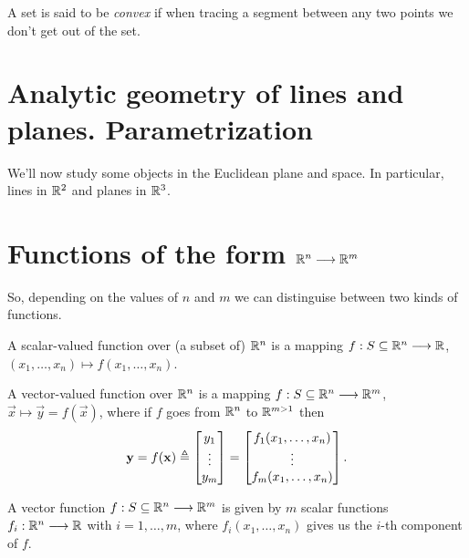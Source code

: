 \begin{defn}
A set is said to be \textit{convex} if when tracing a segment between any two points we don't get out of the set.
\end{defn}

\section{Analytic geometry of lines and planes. Parametrization}
We'll now study some objects in the Euclidean plane and space. In particular, lines in $\R^2$ and planes in $\R^3$.

\section{Functions of the form $\Rtn\longrightarrow\R^m$}
So, depending on the values of $n$ and $m$ we can distinguise between two kinds of functions.

\begin{defn}\label{def:scalar-function}
	A scalar-valued function over (a subset of) $\Rtn$ is a mapping $\appl{f}{S\subseteq\Rtn}{\R}$, $\left(x_1, \ldots, x_n\right)
	\longmapsto f\left(x_1, \ldots, x_n\right)$.
\end{defn}

\begin{defn}
	A vector-valued function over $\Rtn$ is a mapping $\appl{f}{S\subseteq\Rtn}{\R^m}$, $\vec{x}\longmapsto\vec{y} = f(\vec{x})$, where
	if $f$ goes from $\Rtn$ to $\R^{m>1}$ then
	\begin{equation}
		\mathbf{y} = f(\mathbf{x})\triangleq\begin{bmatrix}y_1 \\ \vdots \\ y_m \end{bmatrix} = \begin{bmatrix}f_1(x_1, \ldots, x_n) \\
		\vdots \\ f_m(x_1, \ldots, x_n)\end{bmatrix}.
	\end{equation}
\end{defn}

\begin{remark}
	A vector function $\appl{f}{S\subseteq\Rtn}{\R^m}$ is given by $m$ scalar functions $\appl{f_i}{\Rtn}{\R}$ with $i = 1, \ldots,
	m$, where $f_i(x_1, \ldots, x_n)$ gives us the $i$-th component of $f$.
\end{remark}


